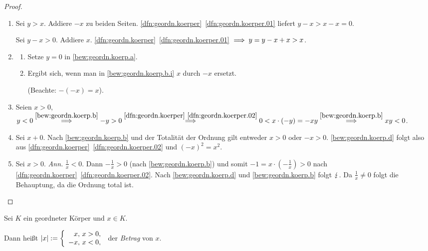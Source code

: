 \documentclass[12pt]{scrreprt}
\begin{document}
\begin{proof}
\begin{enumerate} %
\item\label{bew:geordn.koerp.a} Sei $y > x$. Addiere $-x$ zu beiden Seiten. \ref{dfn:geordn.koerper}~\ref{dfn:geordn.koerper.01} liefert $y - x > x - x = 0$.

Sei $y - x > 0$. Addiere $x$. \ref{dfn:geordn.koerper}~\ref{dfn:geordn.koerper.01} $\implies y = y - x + x > x$.

\item\label{bew:geordn.koerp.b} \begin{enumerate} %
	\item\label{bew:geordn.koerp.b.i} Setze $y = 0$ in \ref{bew:geordn.koerp.a}.
	\item Ergibt sich, wenn man in \ref{bew:geordn.koerp.b.i} $x$ durch $-x$ ersetzt.
  
	(Beachte: $-(-x) = x$).
\end{enumerate}

\item Seien $x > 0$, $y < 0 \stackrel{\ref{bew:geordn.koerp.b}}{\implies} -y > 0 \stackrel{\ref{dfn:geordn.koerper}~\ref{dfn:geordn.koerper.02}}{\implies} 0 < x \cdot (-y) = -xy \stackrel{\ref{bew:geordn.koerp.b}}{\implies} xy < 0$.

\item\label{bew:geordn.koerp.d} Sei $x + 0$. Nach \ref{bew:geordn.koerp.b} und der Totalität der Ordnung gilt entweder $x>0$ oder $-x>0$. \ref{bew:geordn.koerp.d} folgt also aus \ref{dfn:geordn.koerper}~\ref{dfn:geordn.koerper.02} und $(-x)^2 = x^2$.

\item Sei $x>0$. \emph{Ann.} $\displaystyle\frac{1}{x} < 0$. Dann $\displaystyle-\frac{1}{x} > 0$ (nach \ref{bew:geordn.koerp.b}) und somit $\displaystyle-1 = x\cdot\left(-\frac{1}{x}\right) > 0$ nach \ref{dfn:geordn.koerper}~\ref{dfn:geordn.koerper.02}. Nach \ref{bew:geordn.koerp.d} und \ref{bew:geordn.koerp.b} folgt $\lightning$. Da $\displaystyle\frac{1}{x} \neq 0$ folgt die Behauptung, da die Ordnung total ist.
\end{enumerate}
\end{proof}

\begin{dfn}\label{dfn:betrag}
Sei $K$ ein geordneter Körper und $x \in K$.

Dann heißt $\displaystyle|x| := \left\{\begin{array}{r @{,\ } l}x&x>0,\\-x&x<0,\\\end{array}\right.$ der \emph{Betrag} von $x$.
\end{dfn}
\end{document}
